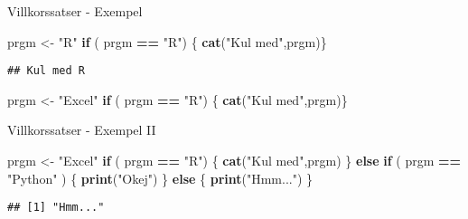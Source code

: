 \documentclass[
  11pt,
  ignorenonframetext,
]{beamer}
\newenvironment{Shaded}{\begin{snugshade}}{\end{snugshade}}
\newcommand{\ControlFlowTok}[1]{\textcolor[rgb]{0.13,0.29,0.53}{\textbf{#1}}}
\newcommand{\FunctionTok}[1]{\textcolor[rgb]{0.13,0.29,0.53}{\textbf{#1}}}
\newcommand{\NormalTok}[1]{#1}
\newcommand{\OtherTok}[1]{\textcolor[rgb]{0.56,0.35,0.01}{#1}}
\newcommand{\SpecialCharTok}[1]{\textcolor[rgb]{0.81,0.36,0.00}{\textbf{#1}}}
\newcommand{\StringTok}[1]{\textcolor[rgb]{0.31,0.60,0.02}{#1}}
\begin{document}
\begin{frame}[fragile]{Villkorssatser - Exempel}
\label{villkorssatser---exempel}
\begin{Shaded}
\begin{Highlighting}[]
\NormalTok{prgm }\OtherTok{\textless{}{-}} \StringTok{"R"}
\ControlFlowTok{if}\NormalTok{ ( prgm }\SpecialCharTok{==} \StringTok{"R"}\NormalTok{) \{ }\FunctionTok{cat}\NormalTok{(}\StringTok{"Kul med"}\NormalTok{,prgm)\}}
\end{Highlighting}
\end{Shaded}

\pause

\begin{verbatim}
## Kul med R
\end{verbatim}

\pause

\begin{Shaded}
\begin{Highlighting}[]
\NormalTok{prgm }\OtherTok{\textless{}{-}} \StringTok{"Excel"}
\ControlFlowTok{if}\NormalTok{ ( prgm }\SpecialCharTok{==} \StringTok{"R"}\NormalTok{) \{ }\FunctionTok{cat}\NormalTok{(}\StringTok{"Kul med"}\NormalTok{,prgm)\}}
\end{Highlighting}
\end{Shaded}
\end{frame}

\begin{frame}[fragile]{Villkorssatser - Exempel II}
\label{villkorssatser---exempel-ii}
\begin{Shaded}
\begin{Highlighting}[]
\NormalTok{prgm }\OtherTok{\textless{}{-}} \StringTok{"Excel"}
\ControlFlowTok{if}\NormalTok{ ( prgm }\SpecialCharTok{==} \StringTok{"R"}\NormalTok{) \{ }
  \FunctionTok{cat}\NormalTok{(}\StringTok{"Kul med"}\NormalTok{,prgm)}
\NormalTok{\} }\ControlFlowTok{else} \ControlFlowTok{if}\NormalTok{ ( prgm }\SpecialCharTok{==} \StringTok{"Python"}\NormalTok{ ) \{}
  \FunctionTok{print}\NormalTok{(}\StringTok{"Okej"}\NormalTok{)}
\NormalTok{\} }\ControlFlowTok{else}\NormalTok{ \{}
  \FunctionTok{print}\NormalTok{(}\StringTok{"Hmm..."}\NormalTok{)}
\NormalTok{\}}
\end{Highlighting}
\end{Shaded}

\pause

\begin{verbatim}
## [1] "Hmm..."
\end{verbatim}
\end{frame}
\end{document}
